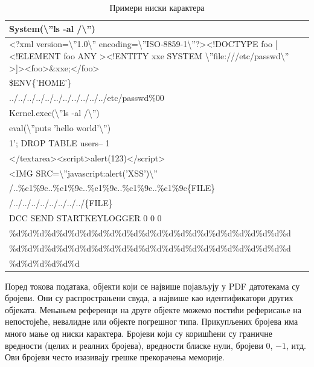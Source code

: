 \documentclass[12pt,oneside]{memoir}
\begin{document}
\begin{table}
    \begin{tabular}{| p{14cm} |}
    \hline
    System(\textbackslash''ls -al /\textbackslash'') \\ \hline
    <?xml version=\textbackslash''1.0\textbackslash'' encoding=\textbackslash''ISO-8859-1\textbackslash''?><!DOCTYPE foo [ <!ELEMENT foo ANY ><!ENTITY xxe SYSTEM \textbackslash''file:///etc/passwd\textbackslash'' >]><foo>\&xxe;</foo> \\ \hline
	\$ENV\{'HOME'\}\\ \hline
	../../../../../../../../../../../etc/passwd\%00\\ \hline
	Kernel.exec(\textbackslash''ls -al /\textbackslash'')\\ \hline
	eval(\textbackslash''puts 'hello world'\textbackslash'')\\ \hline
	1'; DROP TABLE users-- 1\\ \hline
	</textarea><script>alert(123)</script>\\ \hline
	<IMG SRC=\textbackslash''javascript:alert('XSS')\textbackslash''\\ \hline
	/..\%c1\%9c..\%c1\%9c..\%c1\%9c..\%c1\%9c..\%c1\%9c\{FILE\}\\ \hline
	/../../../../../../../../\{FILE\}\\ \hline
    	DCC SEND STARTKEYLOGGER 0 0 0 \\ \hline
\%d\%d\%d\%d\%d\%d\%d\%d\%d\%d\%d\%d\%d\%d\%d\%d\%d\%d\%d\%d\%d\%d\%d\%d \\ 
\%d\%d\%d\%d\%d\%d\%d\%d\%d\%d\%d\%d\%d\%d\%d\%d\%d\%d\%d\%d\%d\%d\%d\%d \\
\%d\%d\%d\%d\%d\%d  \\
    	\hline
    \end{tabular}
\caption{Примери ниски карактера}
\label{table:niske}
\end{table}

Поред токова података, објекти који се највише појављују у PDF датотекама су бројеви. Они су распрострањени свуда, а највише као идентификатори других објеката. Мењањем референци на друге објекте можемо постићи реферисање на непостојеће, невалидне или објекте погрешног типа. Прикупљених бројева има много мање од ниски карактера. Бројеви који су коришћени су граничне вредности (целих и реалних бројева), вредности блиске нули, бројеви $0$, $-1$, итд. Ови бројеви често изазивају грешке прекорачења меморије. 
\end{document}
